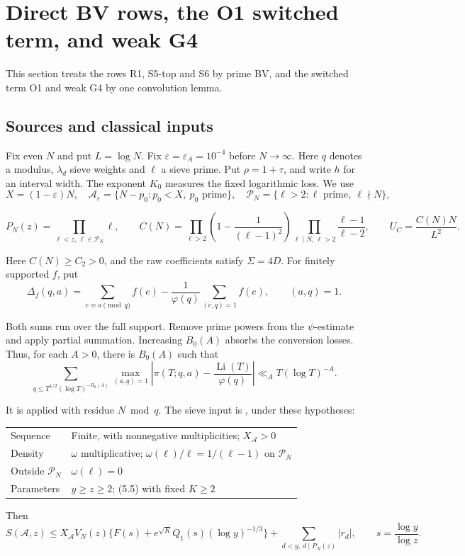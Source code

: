 \section{Direct BV rows, the O1 switched term, and weak G4}

This section treats the rows R1, S5-top and S6 by prime BV,
and the switched term O1 and weak G4 by one convolution lemma.

\subsection{Sources and classical inputs}

Fix even $N$ and put $L=\log N$.
Fix $\varepsilon=\varepsilon_A=10^{-4}$ before $N\to\infty$.
Here $q$ denotes a modulus, $\lambda_d$ sieve weights
and $\ell$ a sieve prime.
Put $\rho=1+\tau$, and write $h$ for an interval width.
The exponent $K_0$ measures the fixed logarithmic loss.
We use
\begingroup\small
\[
 X=(1-\varepsilon)N,\quad
 \mathcal A_\varepsilon=\{N-p_0:p_0<X,\ p_0\text{ prime}\},\quad
 \mathcal P_N=\{\ell>2:\ell\text{ prime},\ \ell\nmid N\},
\]

\[
 P_N(z)=\prod_{\ell<z,\,\ell\in\mathcal P_N}\ell,\qquad
 C(N)=\prod_{\ell>2}\left(1-\frac1{(\ell-1)^2}\right)
       \prod_{\ell\mid N,\,\ell>2}\frac{\ell-1}{\ell-2},\qquad
 U_C=\frac{C(N)N}{L^2}.
\tag{5.1}
\]

\endgroup
Here $C(N)\ge C_2>0$, and the raw coefficients satisfy $\Sigma=4D$.
For finitely supported $f$, put
\[
 \Delta_f(q,a)=\sum_{e\equiv a\pmod q}f(e)
       -\frac1{\varphi(q)}\sum_{(e,q)=1}f(e),\qquad (a,q)=1.
\tag{5.2}
\]

Both sums run over the full support.
Remove prime powers from the $\psi$-estimate \cite[(2.20)]{Z1}
and apply partial summation. Increasing $B_0(A)$ absorbs the conversion
losses. Thus, for each $A>0$, there is $B_0(A)$ such that
\[
 \sum_{q\le T^{1/2}(\log T)^{-B_0(A)}}
 \max_{(a,q)=1}\left|\pi(T;q,a)-\frac{\operatorname{Li}(T)}{\varphi(q)}\right|
 \ll_A T(\log T)^{-A}.
\tag{5.3}
\]

It is applied with residue $N\bmod q$.
The sieve input is \cite[Theorem~2.5, (2.25)]{Z1}, under these hypotheses:

\begin{center}
\begin{tabular}{@{}ll@{}}
\toprule
Sequence & Finite, with nonnegative multiplicities; $X_{\mathcal A}>0$ \\
Density & $\omega$ multiplicative; $\omega(\ell)/\ell=1/(\ell-1)$ on $\mathcal P_N$ \\
Outside $\mathcal P_N$ & $\omega(\ell)=0$ \\
Parameters & $y\ge z\ge2$; (5.5) with fixed $K\ge2$ \\
\bottomrule
\end{tabular}
\end{center}
Then
\[
 S(\mathcal A,z)\le X_{\mathcal A}V_N(z)
 \{F(s)+e^{\sqrt K}Q_1(s)(\log y)^{-1/3}\}
 +\sum_{d<y,\,d\mid P_N(z)}|r_d|,
 \qquad s=\frac{\log y}{\log z}.
\tag{5.4}
\]

